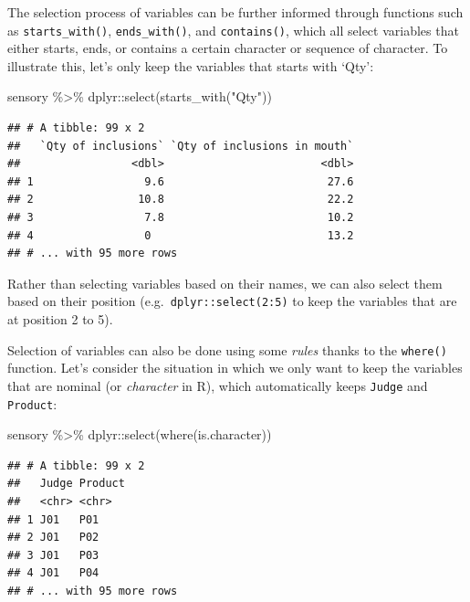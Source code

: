\documentclass[
]{krantz}
\makeatletter
\newenvironment{Shaded}{\begin{snugshade}}{\end{snugshade}}
\newcommand{\FunctionTok}[1]{\textcolor[rgb]{0,0,0}{#1}}
\newcommand{\NormalTok}[1]{#1}
\newcommand{\SpecialCharTok}[1]{\textcolor[rgb]{0,0,0}{#1}}
\newcommand{\StringTok}[1]{\textcolor[rgb]{0.5,0.5,0.5}{#1}}
\newenvironment{kframe}{%
\medskip{}
\setlength{\fboxsep}{.8em}
 \def\at@end@of@kframe{}%
 \ifinner\ifhmode%
  \def\at@end@of@kframe{\end{minipage}}%
  \begin{minipage}{\columnwidth}%
 \fi\fi%
 \def\FrameCommand##1{\hskip\@totalleftmargin \hskip-\fboxsep
 \colorbox{shadecolor}{##1}\hskip-\fboxsep
     \hskip-\linewidth \hskip-\@totalleftmargin \hskip\columnwidth}%
 \MakeFramed {\advance\hsize-\width
   \@totalleftmargin\z@ \linewidth\hsize
   \@setminipage}}%
 {\par\unskip\endMakeFramed%
 \at@end@of@kframe}
\renewenvironment{Shaded}{\begin{kframe}}{\end{kframe}}
\makeatother
\begin{document}
The selection process of variables can be further informed through functions such as \texttt{starts\_with()}, \texttt{ends\_with()}, and \texttt{contains()}, which all select variables that either starts, ends, or contains a certain character or sequence of character. To illustrate this, let's only keep the variables that starts with `Qty':

\begin{Shaded}
\begin{Highlighting}[]
\NormalTok{sensory }\SpecialCharTok{\%\textgreater{}\%}
\NormalTok{  dplyr}\SpecialCharTok{::}\FunctionTok{select}\NormalTok{(}\FunctionTok{starts\_with}\NormalTok{(}\StringTok{"Qty"}\NormalTok{))}
\end{Highlighting}
\end{Shaded}

\begin{verbatim}
## # A tibble: 99 x 2
##   `Qty of inclusions` `Qty of inclusions in mouth`
##                 <dbl>                        <dbl>
## 1                 9.6                         27.6
## 2                10.8                         22.2
## 3                 7.8                         10.2
## 4                 0                           13.2
## # ... with 95 more rows
\end{verbatim}

Rather than selecting variables based on their names, we can also select them based on their position (e.g.~\texttt{dplyr::select(2:5)} to keep the variables that are at position 2 to 5).

Selection of variables can also be done using some \emph{rules} thanks to the \texttt{where()} function. Let's consider the situation in which we only want to keep the variables that are nominal (or \emph{character} in R), which automatically keeps \texttt{Judge} and \texttt{Product}:

\begin{Shaded}
\begin{Highlighting}[]
\NormalTok{sensory }\SpecialCharTok{\%\textgreater{}\%}
\NormalTok{  dplyr}\SpecialCharTok{::}\FunctionTok{select}\NormalTok{(}\FunctionTok{where}\NormalTok{(is.character))}
\end{Highlighting}
\end{Shaded}

\begin{verbatim}
## # A tibble: 99 x 2
##   Judge Product
##   <chr> <chr>  
## 1 J01   P01    
## 2 J01   P02    
## 3 J01   P03    
## 4 J01   P04    
## # ... with 95 more rows
\end{verbatim}
\end{document}
